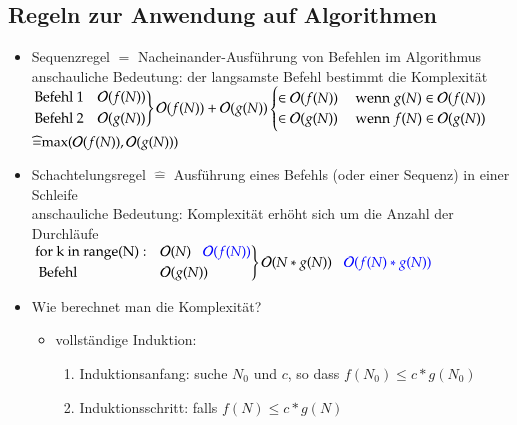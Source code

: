 \subsection*{Regeln zur Anwendung auf Algorithmen}
\begin{itemize}
    \item Sequenzregel $\widehat{=}$ Nacheinander-Ausführung von Befehlen im Algorithmus \\
    anschauliche Bedeutung: der langsamste Befehl bestimmt die Komplexität \\
    $\begin{rcases}
    \text{Befehl 1} & \mathcal{O}{}(f(N)) \\
    \text{Befehl 2} & \mathcal{O}{}(g(N))\\ \end{rcases} \mathcal{O}{}(f(N)) + \mathcal{O}{}(g(N)) \begin{cases}
    \in \mathcal{O}{}(f(N)) & \text{ wenn } g(N) \in \mathcal{O}{}(f(N)) \\
    \in \mathcal{O}{}(g(N)) & \text{ wenn } f(N) \in \mathcal{O}{}(g(N)) \\ \end{cases}$ \\
    \hspace*{6.5cm} $\widehat{=} \text{max}(\mathcal{O}{}(f(N)), \mathcal{O}{}(g(N)))$
    \item Schachtelungsregel $\widehat{=}$ Ausführung eines Befehls (oder einer Sequenz) in einer Schleife \\
    anschauliche Bedeutung: Komplexität erhöht sich um die Anzahl der Durchläufe \\
    $\begin{rcases}
    \text{for k in range(N)}: & \mathcal{O}{}(N)\hspace*{3mm} \textcolor{blue}{\mathcal{O}{}(f(N))}\\
        \text{  Befehl} & \mathcal{O}{}(g(N)) \end{rcases}\mathcal{O}{}(N*g(N)) \hspace*{3mm} \textcolor{blue}{\mathcal{O}{}(f(N)*g(N))}$
        \item Wie berechnet man die Komplexität?
        \begin{itemize}
            \item vollständige Induktion:
            \begin{enumerate}
                \item Induktionsanfang: suche $N_0$ und $c$, so dass $f(N_0) \leq c*g(N_0)$
                \item Induktionsschritt: falls $f(N) \leq c*g(N)$ \\

\end{enumerate}
\end{itemize}
\end{itemize}
